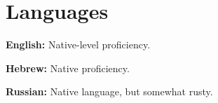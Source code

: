 \section{Languages}
\begin{itemList}
\item \textbf{English:} Native-level proficiency.
\item \textbf{Hebrew:} Native proficiency.
\item \textbf{Russian:} Native language, but somewhat rusty.
\end{itemList}